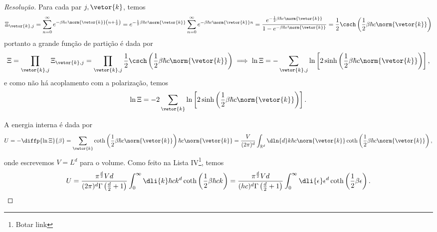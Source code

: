 \begin{proof}[Resolução]
    Para cada par \(j, \vetor{k}\), temos
    \begin{equation*}
        \Xi_{\vetor{k},j} = \sum_{n = 0}^\infty e^{-\beta \hbar c \norm{\vetor{k}} \left(n + \frac12\right)} = e^{-\frac12\beta \hbar c \norm{\vetor{k}}} \sum_{n=0}^\infty e^{- \beta \hbar c \norm{\vetor{k}} n} = \frac{e^{-\frac12 \beta \hbar c \norm{\vetor{k}}}}{1 - e^{-\beta\hbar c \norm{\vetor{k}}}} = \frac12 \csch\left(\frac12 \beta \hbar c \norm{\vetor{k}}\right)
    \end{equation*}
    portanto a grande função de partição é dada por
    \begin{equation*}
        \Xi = \prod_{\vetor{k},j} \Xi_{\vetor{k},j} = \prod_{\vetor{k},j} \frac12 \csch\left(\frac12 \beta \hbar c\norm{\vetor{k}}\right) \implies \ln \Xi = - \sum_{\vetor{k}, j} \ln\left[2\sinh\left(\frac12 \beta \hbar c \norm{\vetor{k}}\right)\right],
    \end{equation*}
    e como não há acoplamento com a polarização, temos
    \begin{equation*}
        \ln \Xi = - 2 \sum_{\vetor{k}} \ln\left[2\sinh\left(\frac12 \beta \hbar c \norm{\vetor{k}}\right)\right].
    \end{equation*}

    A energia interna é dada por
    \begin{equation*}
        U = - \diffp{\ln \Xi}{\beta} = \sum_{\vetor{k}} \coth\left(\frac12 \beta \hbar c \norm{\vetor{k}}\right) \hbar c \norm{\vetor{k}} = \frac{V}{(2\pi)^d}\int_{\mathbb{R}^d} \dln{d}k \hbar c \norm{\vetor{k}} \coth\left(\frac12 \beta \hbar c \norm{\vetor{k}}\right),
    \end{equation*}
    onde escrevemos \(V = L^d\) para o volume. Como feito na Lista IV\footnote{Botar link}, temos
    \begin{equation*}
        U = \frac{\pi^{\frac{d}{2}}Vd}{(2\pi)^d \Gamma\left(\frac{d}{2} + 1\right)} \int_0^\infty \dli{k} \hbar c k^d \coth\left(\frac12 \beta \hbar c k\right) = \frac{\pi^{\frac{d}{2}}V d}{(hc)^d \Gamma\left(\frac{d}{2} + 1\right)} \int_0^\infty \dli{\epsilon} \epsilon^d \coth\left(\frac12 \beta \epsilon\right).
    \end{equation*}

\end{proof}
